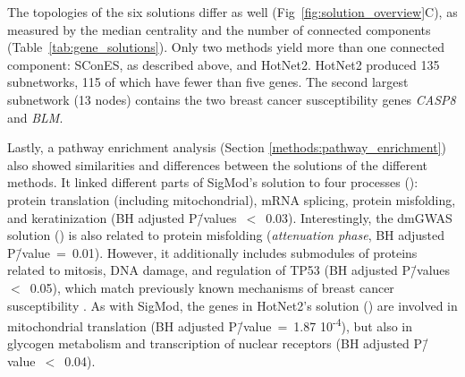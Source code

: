 \documentclass[10pt,letterpaper]{article}
\begin{document}
The topologies of the six solutions differ as well (Fig~\ref{fig:solution_overview}C), as measured by the median centrality  and the number of connected components (Table~\ref{tab:gene_solutions}). Only two methods yield more than one connected component: SConES, as described above, and HotNet2. HotNet2 produced 135 subnetworks, 115 of which have fewer than five genes. The second largest subnetwork (13 nodes) contains the two breast cancer susceptibility genes \emph{CASP8} and \emph{BLM}.

Lastly, a pathway enrichment analysis (Section \ref{methods:pathway_enrichment}) also showed similarities and differences between the solutions of the different methods. It linked different parts of SigMod's solution to four processes (): protein translation (including mitochondrial), mRNA splicing, protein misfolding, and keratinization (BH adjusted P\=/values~$<$~0.03). Interestingly, the dmGWAS solution () is also related to protein misfolding (\emph{attenuation phase}, BH adjusted P\=/value~=~0.01). However, it additionally includes submodules of proteins related to mitosis, DNA damage, and regulation of TP53 (BH adjusted P\=/values~$<$~0.05), which match previously known mechanisms of breast cancer susceptibility \cite{nielsen_hereditary_2016}. As with SigMod, the genes in HotNet2's solution () are involved in mitochondrial translation (BH adjusted P\=/value~=~1.87 \texttimes{} 10\textsuperscript{-4}), but also in glycogen metabolism and transcription of nuclear receptors (BH adjusted P\=/value~$<$~0.04).
\end{document}
